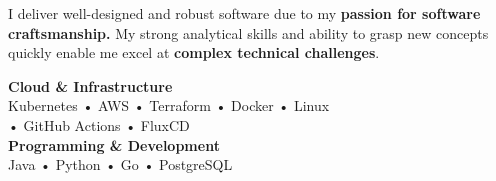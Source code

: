 \documentclass[9pt]{developercv} %
\begin{document}
    \vspace{0.5cm}



    \begin{minipage}[t]{0.4\textwidth} %
        \vspace{-\baselineskip} %
        I deliver well-designed and robust software due to my \textbf{passion for software craftsmanship.}
        My strong analytical skills and ability to grasp new concepts quickly enable me excel at \textbf{complex technical challenges}.
    \end{minipage}
    \hfill %
    \begin{minipage}[t]{0.5\textwidth} %
        \vspace{-\baselineskip} %

        \textbf{Cloud \& Infrastructure}\\
        Kubernetes • AWS • Terraform • Docker • Linux
        \\ • GitHub Actions • FluxCD
        \\

        \textbf{Programming \& Development}\\
        Java • Python • Go • PostgreSQL\\
    \end{minipage}


\end{document}
